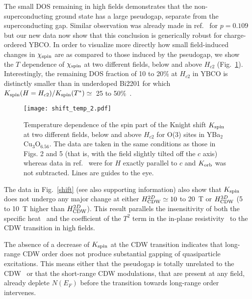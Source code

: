 \documentclass[superscriptaddress,twocolumn,prl,preprintnumbers,amsmath,amssymb]{revtex4}
\begin{document}
The small DOS remaining in high fields demonstrates that the non-superconducting ground state has a large pseudogap, separate from the superconducting gap. Similar observation was already made in ref.~\cite{Wu13} for $p=0.109$ but our new data now show that this conclusion is generically robust for charge-ordered YBCO. In order to visualize more directly how small field-induced changes in $\chi_{\rm spin}$ are as compared to those induced by the pseudogap, we show the $T$ dependence of $\chi_{\rm spin}$ at two different fields, below and above $H_{c2}$ (Fig.~\ref{shift_temp}). Interestingly, the remaining DOS fraction of 10 to 20\% at $H_{c2}$ in YBCO is distinctly smaller than in underdoped Bi2201 for which $K_{\rm spin}(H=H_{c2})/K_{\rm spin}(T^*)\simeq$~25 to 50\%~\cite{Kawasaki10}.

\begin{figure}[t!]%
\centerline{\texttt{[image: shift\_temp\_2.pdf]}} %
 \caption{Temperature dependence of the spin part of the Knight shift $K_{\rm spin}$ at two different fields, below and above $H_{c2}$ for O(3) sites in YBa$_2$Cu$_3$O$_{6.56}$. The data are taken in the same conditions as those in Figs. 2 and 5 (that is, with the field slightly tilted off the $c$ axis) whereas data in ref.~\cite{Wu13} were for $H$ exactly parallel to $c$ and $K_{\rm orb}$ was not subtracted. Lines are guides to the eye.}
 \label{shift_temp}
\end{figure}

The data in Fig.~\ref{shift} (see also supporting information) also show that $K_{\rm spin}$ does not undergo any major change at either $H_{\rm CDW}^{2D}\simeq10$ to 20~T or $H_{\rm CDW}^{3D}$ (5 to 10~T higher than $H_{\rm CDW}^{2D}$). This result parallels the insensitivity of both the specific heat~\cite{Riggs11,Marcenat15} and the coefficient of the $T^2$ term in the in-plane resistivity~\cite{Proust16} to the CDW transition in high fields.

The absence of a decrease of $K_{\rm spin}$ at the CDW transition indicates that long-range CDW order does not produce substantial gapping of quasiparticle excitations. This means either that the pseudogap is totally unrelated to the CDW~\cite{Verret17} or that the short-range CDW modulations, that are present at any field, already deplete $N(E_F)$ before the transition towards long-range order intervenes.
\end{document}
